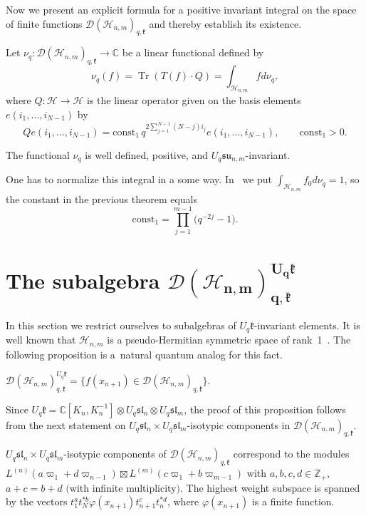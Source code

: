 \documentclass[pdftex]{sigma}
\begin{document}
Now we present an explicit formula for a positive invariant integral on the space of f\/inite functions
$\mathscr{D}(\mathscr{H}_{n,m})_{q,\mathfrak{k}}$ and thereby establish its existence.

Let $\nu_q:\mathscr{D}(\mathscr{H}_{n,m})_{q,\mathfrak{k}} \to\mathbb{C}$ be a linear functional def\/ined by
\[
\nu_q(f)=\operatorname{Tr}(T(f)\cdot Q)=\int_{\mathscr{H}_{n,m}} fd\nu_q,
\]
where $Q:\mathscr{H}\to\mathscr{H}$ is the linear operator given on the basis elements
$e(i_1,\ldots,i_{N-1})$ by
\[
Qe(i_1,\ldots,i_{N-1})= \mathrm{const_1} \, q^{2\sum\limits_{j=1}^{N-1}(N-j)i_j}e(i_1,\ldots,i_{N-1}),
\qquad \mathrm{const_1}>0.
\]

\begin{theorem}
The functional $\nu_q$ is well defined, positive, and $U_{q}\mathfrak{su}_{n,m}$-invariant.
\end{theorem}

One has to normalize this integral in a some way. In~\cite{BS} we put $\int_{\mathscr{H}_{n,m}} f_0
d\nu_q=1$, so the constant in the previous theorem equals
\[
\mathrm{const_1}= \prod\limits_{j=1}^{m-1}\big(q^{-2j}-1\big).
\]



\section[The subalgebra $\mathscr{D}(\mathscr{H}_{n,m})_{q,\mathfrak{k}}^{U_q \mathfrak{k}}$]{The subalgebra $\boldsymbol{\mathscr{D}(\mathscr{H}_{n,m})_{q,\mathfrak{k}}^{U_q \mathfrak{k}}}$}\label{sec_4}

In this section we restrict ourselves to subalgebras of $U_q \mathfrak k$-invariant elements. It is well
known that $\mathscr{H}_{n,m}$ is a pseudo-Hermitian symmetric space of rank~1~\cite{Molch2}. The following
proposition is a~natural quantum analog for this fact.

\begin{proposition}
$\mathscr{D}(\mathscr{H}_{n,m})_{q,\mathfrak{k}}^{U_q \mathfrak{k}}=\{f(x_{n+1}) \in
\mathscr{D}(\mathscr{H}_{n,m})_{q,\mathfrak{k}}\}$.
\end{proposition}
Since $U_q \mathfrak{k}=\mathbb C[K_n,K_n^{-1}] \otimes U_q \mathfrak{sl}_n \otimes U_q \mathfrak{sl}_m$, the
proof of this proposition follows from the next statement on $U_q \mathfrak{sl}_n \times U_q
\mathfrak{sl}_m$-isotypic components in $\mathscr{D}(\mathscr{H}_{n,m})_{q,\mathfrak{k}}$.
\begin{proposition}
$U_q \mathfrak{sl}_n \times U_q \mathfrak{sl}_m$-isotypic components of
$\mathscr{D}(\mathscr{H}_{n,m})_{q,\mathfrak{k}}$ correspond to the modules $L^{(n)}(a\varpi_1+d\varpi_{n-1})
\boxtimes L^{(m)}(c\varpi_1 +b \varpi_{m-1})$ with $a,b,c,d \in \mathbb Z_+$, $a+c=b+d$ $($with infinite
multiplicity$)$. The highest weight subspace is spanned by the vectors
$t_1^at_N^{*b}\varphi(x_{n+1})t_{n+1}^ct_n^{*d}$, where $\varphi(x_{n+1})$ is a finite function.
\end{proposition}
\end{document}

